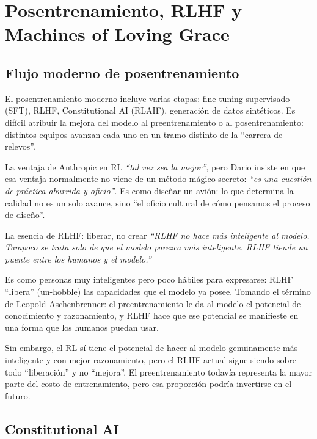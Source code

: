 \documentclass[a4paper]{article}
\begin{document}
\section{Posentrenamiento, RLHF y Machines of Loving Grace}

\subsection{Flujo moderno de posentrenamiento}

El posentrenamiento moderno incluye varias etapas: fine-tuning supervisado (SFT), RLHF, Constitutional AI (RLAIF), generación de datos sintéticos. Es difícil atribuir la mejora del modelo al preentrenamiento o al posentrenamiento: distintos equipos avanzan cada uno en un tramo distinto de la ``carrera de relevos''.

La ventaja de Anthropic en RL \textit{``tal vez sea la mejor''}, pero Dario insiste en que esa ventaja normalmente no viene de un método mágico secreto: \textit{``es una cuestión de práctica aburrida y oficio''}. Es como diseñar un avión: lo que determina la calidad no es un solo avance, sino ``el oficio cultural de cómo pensamos el proceso de diseño''.

\begin{importantbox}{La esencia de RLHF: liberar, no crear}
\textit{``RLHF no hace más inteligente al modelo. Tampoco se trata solo de que el modelo parezca más inteligente. RLHF tiende un puente entre los humanos y el modelo.''}

Es como personas muy inteligentes pero poco hábiles para expresarse: RLHF ``libera'' (un-hobble) las capacidades que el modelo ya posee. Tomando el término de Leopold Aschenbrenner: el preentrenamiento le da al modelo el potencial de conocimiento y razonamiento, y RLHF hace que ese potencial se manifieste en una forma que los humanos puedan usar.

Sin embargo, el RL sí tiene el potencial de hacer al modelo genuinamente más inteligente y con mejor razonamiento, pero el RLHF actual sigue siendo sobre todo ``liberación'' y no ``mejora''. El preentrenamiento todavía representa la mayor parte del costo de entrenamiento, pero esa proporción podría invertirse en el futuro.
\end{importantbox}

\subsection{Constitutional AI}
\end{document}
